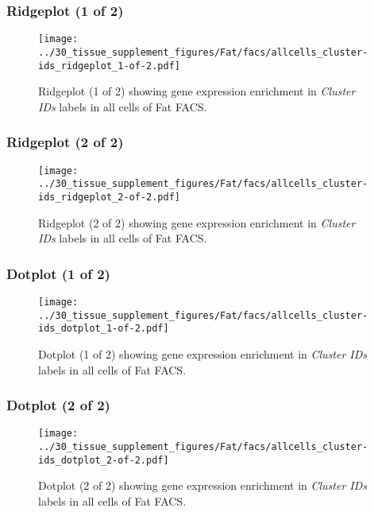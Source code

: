 \clearpage

\subsubsection{Ridgeplot (1 of 2)}
\begin{figure}[h]
\centering
\texttt{[image: ../30\_tissue\_supplement\_figures/Fat/facs/allcells\_cluster-ids\_ridgeplot\_1-of-2.pdf]}

\caption{ Ridgeplot (1 of 2)  showing gene expression enrichment in \emph{Cluster IDs} labels in all cells of Fat FACS. }
\end{figure}


\clearpage

\subsubsection{Ridgeplot (2 of 2)}
\begin{figure}[h]
\centering
\texttt{[image: ../30\_tissue\_supplement\_figures/Fat/facs/allcells\_cluster-ids\_ridgeplot\_2-of-2.pdf]}

\caption{ Ridgeplot (2 of 2)  showing gene expression enrichment in \emph{Cluster IDs} labels in all cells of Fat FACS. }
\end{figure}


\clearpage

\subsubsection{Dotplot (1 of 2)}
\begin{figure}[h]
\centering
\texttt{[image: ../30\_tissue\_supplement\_figures/Fat/facs/allcells\_cluster-ids\_dotplot\_1-of-2.pdf]}

\caption{ Dotplot (1 of 2)  showing gene expression enrichment in \emph{Cluster IDs} labels in all cells of Fat FACS. }
\end{figure}


\clearpage

\subsubsection{Dotplot (2 of 2)}
\begin{figure}[h]
\centering
\texttt{[image: ../30\_tissue\_supplement\_figures/Fat/facs/allcells\_cluster-ids\_dotplot\_2-of-2.pdf]}

\caption{ Dotplot (2 of 2)  showing gene expression enrichment in \emph{Cluster IDs} labels in all cells of Fat FACS. }
\end{figure}


